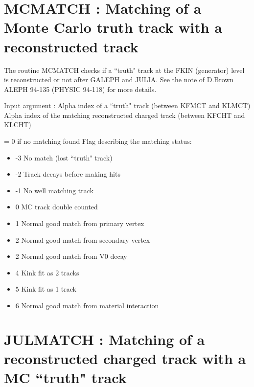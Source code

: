 \par
\section{\label{sec-OAMCMAT}MCMATCH : Matching of a Monte Carlo truth track with a reconstructed track}
\par
{}
\par
 
 
     The routine MCMATCH checks if a ``truth" track at the FKIN (generator) level is reconstructed or not
     after GALEPH and JULIA. See the note of D.Brown ALEPH 94-135 (PHYSIC 94-118) for more details.
 
 
\begin{indentlist}{ 3.50cm}{ 3.75cm}
      Input argument :   Alpha index of a ``truth"  track (between KFMCT and KLMCT)
      Alpha index of the matching reconstructed charged track (between KFCHT and KLCHT)
 
                         = 0 if no matching found
   Flag describing the matching status:
 
\begin{itemize}
\item                         -3    No match (lost ``truth" track)
\item                         -2    Track decays before making hits
\item                         -1    No well matching track
\item                          0    MC track double counted
\item                          1    Normal good match from primary vertex
\item                          2    Normal good match from secondary vertex
\item                          2    Normal good match from V0 decay
\item                          4    Kink fit as 2 tracks
\item                          5    Kink fit as 1 track
\item                          6    Normal good match from material interaction
\end{itemize}
\end{indentlist}
 
\par
\section{\label{sec-OAJULMAT}JULMATCH : Matching of a reconstructed charged track with a MC ``truth" track}
\par
{}
\par
 
